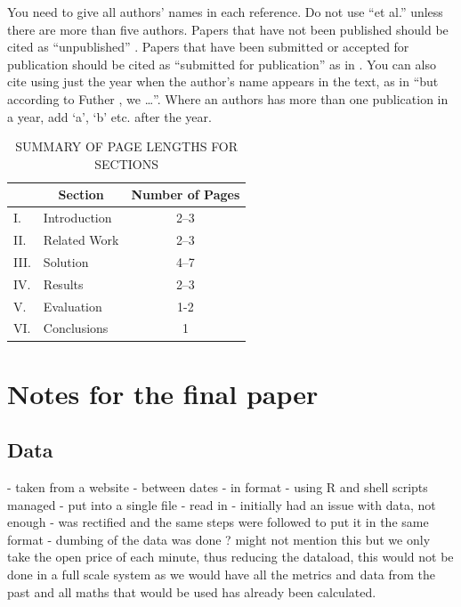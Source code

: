 \documentclass[conference]{IEEEtran}
\begin{document}
You need to give all authors' names in each reference.  Do not use ``et al.'' unless there are more than five authors.  Papers that have not been published should be cited as ``unpublished'' \cite{euther}.  Papers that have been submitted or accepted for publication should be cited as ``submitted for publication'' as in \cite{futher} .  You can also cite using just the year when the author's name appears in the text, as in ``but according to Futher \citeyear{futher}, we \dots''.  Where an authors has more than one publication in a year, add `a', `b' etc. after the year.

\begin{table}[htb]
\centering
\caption{SUMMARY OF PAGE LENGTHS FOR SECTIONS}
\vspace*{6pt}
\label{summary}
\begin{tabular}{|ll|c|} \hline
& \multicolumn{1}{c|}{\bf Section} & {\bf Number of Pages} \\ \hline
I. & Introduction & 2--3 \\ \hline
II. & Related Work & 2--3 \\ \hline
III. & Solution & 4--7 \\ \hline
IV. & Results & 2--3 \\ \hline
V. & Evaluation & 1-2 \\ \hline
VI. & Conclusions & 1 \\ \hline
\end{tabular}
\end{table}

\section*{Notes for the final paper}

\subsection*{Data}
- taken from a website
- between dates
- in format
- using R and shell scripts managed
- put into a single file
- read in
- initially had an issue with data, not enough
- was rectified and the same steps were followed to put it in the same format
- dumbing of the data was done ? might not mention this but we only take the open price of each minute, thus reducing the dataload, this would not be done in a full scale system as we would have all the metrics and data from the past and all maths that would be used has already been calculated.
\end{document}
